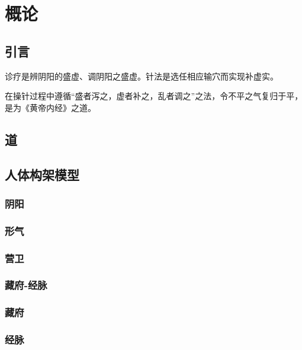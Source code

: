 \documentclass[
]{book}
\begin{document}
\chapter{概论}\label{ux6982ux8bba}

\section*{引言}\label{ux5f15ux8a00}

诊疗是辨阴阳的盛虚、调阴阳之盛虚。针法是选任相应输穴而实现补虚实。

在操针过程中遵循``盛者泻之，虚者补之，乱者调之''之法，令不平之气复归于平，是为《黄帝内经》之道。

\section{道}\label{ux9053}

\section{人体构架模型}\label{ux4ebaux4f53ux6784ux67b6ux6a21ux578b}

\subsection{阴阳}\label{ux9634ux9633}

\subsection{形气}\label{ux5f62ux6c14}

\subsection{营卫}\label{ux8425ux536b}

\subsection{藏府-经脉}\label{ux85cfux5e9c-ux7ecfux8109}

\subsection{藏府}\label{ux85cfux5e9c}

\subsection{经脉}\label{ux7ecfux8109}
\end{document}
